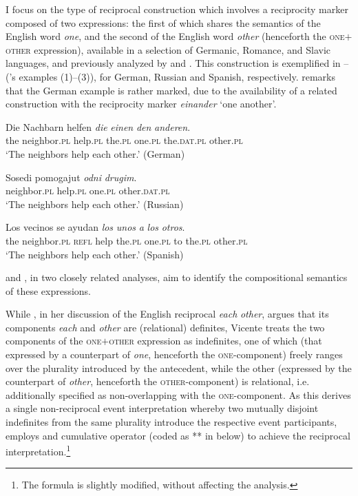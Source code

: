 \documentclass[output=paper,colorlinks,citecolor=brown]{langscibook}
\begin{document}
I focus on the type of reciprocal construction which involves a reciprocity marker composed of two expressions: the first of which shares the semantics of the English word \textit{one}, and the second of the English word \textit{other} (henceforth the \textsc{one$+$other} expression), available in a selection of Germanic, Romance, and Slav\-ic languages, and previously analyzed by \citet{v10} and \citet{z14}. This construction is exemplified in -- (\citeauthor{z14}'s examples (1)--(3)), for German, Russian and Spanish, respectively. \citeauthor{z14} remarks that the German example is rather marked, due to the availability of a related construction with the reciprocity marker \textit{einander} `one another'.

\ea\label{ex:arsenijevic:Nachbarn1-D}
\gll Die Nachbarn helfen \textit{die} \textit{einen} \textit{den} \textit{anderen}. \\
 the neighbor.\textsc{pl} help.\textsc{pl} the.\textsc{pl} one.\textsc{pl} the.\textsc{dat.\textsc{pl}} other.\textsc{pl}\\
\glt`The neighbors help each other.' \hfill (German)
\z

\ea\label{ex:arsenijevic:Nachbarn1-R}
\gll Sosedi pomogajut \textit{odni} \textit{drugim}.\\
neighbor.\textsc{pl} help.\textsc{pl} one.\textsc{pl} other.\textsc{dat.\textsc{pl}}\\
\glt`The neighbors help each other.' \hfill (Russian)
\z

\ea\label{ex:arsenijevic:Nachbarn1-E}
\gll Los vecinos se ayudan \textit{los} \textit{unos} \textit{a} \textit{los} \textit{otros}.\\
 the neighbor.\textsc{pl} \textsc{refl} help the.\textsc{pl} one.\textsc{pl} to the.\textsc{pl} other.\textsc{pl}\\
\glt`The neighbors help each other.' \hfill (Spanish)
\z

\noindent \citet{v10} and \citet{z14}, in two closely related analyses, aim to identify the compositional semantics of these expressions. 

While \citet{b01}, in her discussion of the English reciprocal \textit{each} \textit{other}, argues that its components \textit{each} and \textit{other} are (relational) definites, Vicente treats the two components of the \textsc{one$+$other} expression as indefinites, one of which (that expressed by a counterpart of \textit{one}, henceforth the \textsc{one}-component) freely ranges over the plurality introduced by the antecedent, while the other (expressed by the counterpart of \textit{other}, henceforth the \textsc{other}-component) is relational, i.e. additionally specified as non-overlapping with the \textsc{one}-component. As this derives a single non-reciprocal event interpretation whereby two mutually disjoint indefinites from the same plurality introduce the respective event participants, \citet{v10} employs  and  cumulative operator (coded as ** in  below) to achieve the reciprocal interpretation.\footnote{The formula is slightly modified, without affecting the analysis.}
\end{document}

